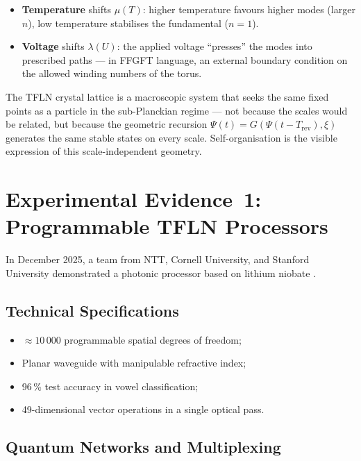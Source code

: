 \begin{itemize}
  \item \textbf{Temperature} shifts $\mu(T)$: higher temperature
    favours higher modes (larger $n$), low temperature stabilises the
    fundamental ($n=1$).
  \item \textbf{Voltage} shifts $\lambda(U)$: the applied voltage
    ``presses'' the modes into prescribed paths — in FFGFT language,
    an external boundary condition on the allowed winding numbers
    of the torus.
\end{itemize}

\begin{keybox}
The TFLN crystal lattice is a macroscopic system that seeks the same
fixed points as a particle in the sub-Planckian regime — not because
the scales would be related, but because the geometric recursion
$\Psi(t) = G(\Psi(t-T_{\text{rev}}), \xi)$ generates the same stable
states on every scale. Self-organisation is the visible expression
of this scale-independent geometry.
\end{keybox}

\section{Experimental Evidence~1: Programmable TFLN Processors}

In December 2025, a team from NTT, Cornell University, and Stanford
University demonstrated a photonic processor based on lithium niobate
\cite{NTT2025}.

\subsection{Technical Specifications}

\begin{itemize}
  \item $\approx 10\,000$ programmable spatial degrees of freedom;
  \item Planar waveguide with manipulable refractive index;
  \item 96\,\% test accuracy in vowel classification;
  \item 49-dimensional vector operations in a single optical pass.
\end{itemize}

\subsection{Quantum Networks and Multiplexing}

